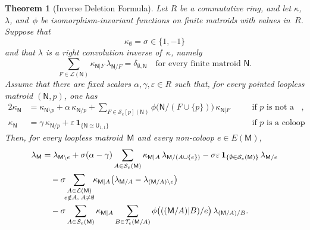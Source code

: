 \documentclass[12pt,letterpaper,english]{amsart}
\theoremstyle{teoremas}
\newtheorem{theorem}{Theorem}[section]
\theoremstyle{definition}
\newcommand{\M}{\mathsf{M}}
\newcommand{\N}{\mathsf{N}}
\newcommand{\U}{\mathsf{U}}
\newcommand{\Se}{\mathcal{S}_e}
\newcommand{\Te}{\mathcal{T}_e}
\begin{document}
\begin{theorem}[Inverse Deletion Formula]\label{thm:inv-del}
Let $R$ be a commutative ring, and let $\kappa$, $\lambda$, and~$\phi$
be isomorphism-invariant functions on finite matroids with values in~$R$.
Suppose that
\[
\kappa_{\emptyset} = \sigma \in \{1, -1\}
\]
and that $\lambda$ is a right convolution inverse of~$\kappa$, namely
\begin{equation}\label{eq:conv-inv}
\sum_{F \in \mathcal{L}(\N)} \kappa_{\N|F}\, \lambda_{\N/F}
= \delta_{\emptyset, \N}
\quad \text{for every finite matroid } \N.
\end{equation}
Assume that there are fixed scalars $\alpha, \gamma, \varepsilon \in R$
such that, for every pointed loopless matroid $(\N, p)$, one has
\begin{alignat}{2}
\kappa_{\N} &= \kappa_{\N \setminus p} + \alpha\, \kappa_{\N/p}
  + \sum_{F \in \Se[p](\N)}
    \phi\bigl(\N/(F \cup \{p\})\bigr)\, \kappa_{\N|F}
  &\quad& \text{if $p$ is not a coloop},
  \label{eq:kappa-noncoloop} \\
\kappa_{\N} &= \gamma\, \kappa_{\N/p}
  + \varepsilon\, \mathbf{1}_{\{\N \cong \U_{1,1}\}}
  &\quad& \text{if $p$ is a coloop}.
  \label{eq:kappa-coloop}
\end{alignat}
Then, for every loopless matroid~$\M$ and every non-coloop
$e \in E(\M)$,
\begin{align}
\lambda_{\M} &= \lambda_{\M \setminus e}
  + \sigma(\alpha - \gamma)
    \sum_{A \in \Se(\M)} \kappa_{\M|A}\, \lambda_{\M/(A \cup \{e\})}
  - \sigma\varepsilon\, \mathbf{1}_{\{\emptyset \in \Se(\M)\}}\,
    \lambda_{\M/e}
    \notag \\
&\quad - \sigma \!\!\sum_{\substack{A \in \mathcal{L}(\M) \\
    e \notin A,\; A \neq \emptyset}} \!\!
    \kappa_{\M|A}\bigl(\lambda_{\M/A} - \lambda_{(\M/A) \setminus e}\bigr)
    \notag \\
&\quad - \sigma \sum_{A \in \Se(\M)} \kappa_{\M|A}
    \sum_{B \in \Te(\M/A)}
    \phi\bigl(((\M/A)|B)/e\bigr)\, \lambda_{(\M/A)/B}.
    \label{eq:inv-del}
\end{align}
\end{theorem}
\end{document}
